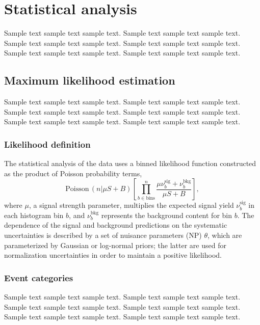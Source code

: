 \chapter{Statistical analysis}

\label{ch:stat-ana}

Sample text sample text sample text. Sample text sample text sample text.
Sample text sample text sample text. Sample text sample text sample text.
Sample text sample text sample text. Sample text sample text sample text.

\section{Maximum likelihood estimation}
Sample text sample text sample text. Sample text sample text sample text.
Sample text sample text sample text. Sample text sample text sample text.
Sample text sample text sample text. Sample text sample text sample text.

\subsection{Likelihood definition}

\par The statistical analysis of the data uses a binned likelihood function constructed as the product of Poisson probability terms,
\begin{equation}
\mathrm{Poisson}\,(n|\mu S+B)\left[ \prod_{b\in \text{bins}}^{n} \frac{\mu \nu^{\mathrm{sig}}_{b}+\nu^{\mathrm{bkg}}_{b}}{\mu S+B} \right],
\end{equation}
where $\mu$, a signal strength parameter, multiplies the expected signal yield $\nu^{\mathrm{sig}}_b$ in each histogram bin $b$, and $\nu^{\mathrm{bkg}}_b$ represents the background content for bin $b$. 
The dependence of the signal and background predictions on the systematic uncertainties is described by a set of nuisance parameters (NP) $\theta$, which are parameterized by Gaussian or log-normal 
priors; the latter are used for normalization uncertainties in order to maintain a positive likelihood.

\subsection{Event categories}
Sample text sample text sample text. Sample text sample text sample text.
Sample text sample text sample text. Sample text sample text sample text.
Sample text sample text sample text. Sample text sample text sample text.

